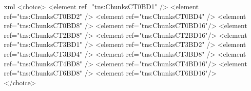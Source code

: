 \begin{listing}[H]
\centering
\begin{cminted}[frame=lines,tabsize=2,fontsize=\small]{xml}
<choice>
	<element ref="tns:ChunksCT0BD1" />
	<element ref="tns:ChunksCT0BD2" />
	<element ref="tns:ChunksCT0BD4" />
	<element ref="tns:ChunksCT0BD8" />
	<element ref="tns:ChunksCT0BD16"/>
	<element ref="tns:ChunksCT2BD8" />
	<element ref="tns:ChunksCT2BD16"/>
	<element ref="tns:ChunksCT3BD1" />
	<element ref="tns:ChunksCT3BD2" />
	<element ref="tns:ChunksCT3BD4" />
	<element ref="tns:ChunksCT3BD8" />
	<element ref="tns:ChunksCT4BD8" />
	<element ref="tns:ChunksCT4BD16"/>
	<element ref="tns:ChunksCT6BD8" />
	<element ref="tns:ChunksCT6BD16"/>
</choice>
\end{cminted}
\caption{XML Schema Explosion Fragment}
\label{lst:schemaexplosion}
\end{listing}

